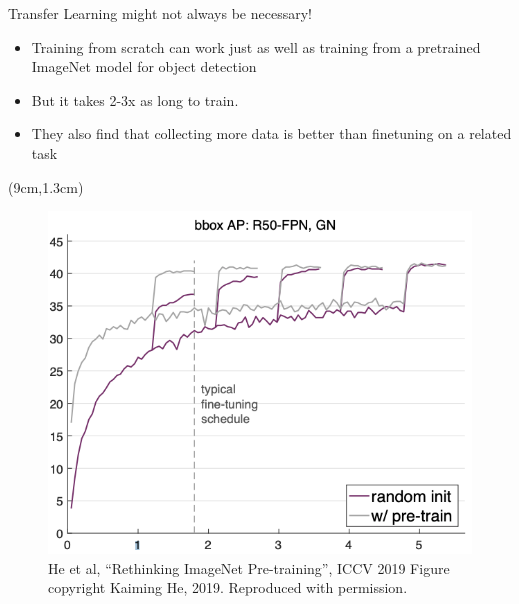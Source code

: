 \documentclass[serif, aspectratio=169]{beamer}
\begin{document}
\begin{frame}{Transfer Learning might not always be necessary!}
	\begin{itemize}
		\item Training from scratch can work just \newline as well as training from a pretrained
		\newline ImageNet model for object detection
		\item But it takes 2-3x as long to train.
		\item They also find that collecting more \newline data is better than finetuning on a 
		\newline related task
	\end{itemize}
	\begin{textblock*}{5cm}(9cm,1.3cm) %
		\begin{figure}
			\includegraphics[keepaspectratio, scale=0.28]{pic/rethinking_imagenet}
			\caption*{\scriptsize He et al, “Rethinking ImageNet Pre-training”, ICCV 2019 Figure copyright Kaiming He, 2019. Reproduced with permission.}
		\end{figure}
	\end{textblock*}
\end{frame}
\end{document}
